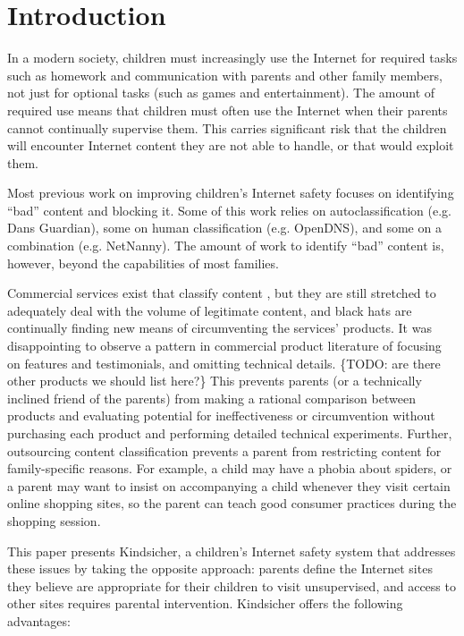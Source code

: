 

\vspace{20mm} 

\section{Introduction}
\nopagebreak
In a modern society, children must increasingly use the Internet for required
tasks such as homework and communication with parents and other family
members, not just for optional tasks (such as games and entertainment). 
%
The amount of required use means that children must often use the Internet
when their parents cannot continually supervise them. 
%
This carries significant risk that the children will encounter Internet
content they are not able to handle, or that would exploit them. 

Most previous work on improving children's Internet safety focuses on
identifying ``bad'' content and blocking it. Some of this work relies
on autoclassification (e.g. Dans Guardian\cite{dansguardian}), some on
human classification (e.g. OpenDNS\cite{opendns}), and some on a
combination (e.g. NetNanny\cite{netnanny}).
%
The amount of work to identify ``bad'' content is, however, beyond the
capabilities of most families.

Commercial services exist that classify content \cite{opendns}\cite{netnanny},
but they are still stretched to adequately deal with the volume of legitimate
content, and black hats are continually finding new means of circumventing the
services' products.
%
It was disappointing to observe a pattern in commercial product literature of
focusing on features and testimonials, and omitting technical
details.\cite{opendns} \{TODO: are there other products we should list here?\}
%
This prevents parents (or a technically inclined friend of the parents) from
making a rational comparison between products and evaluating potential for
ineffectiveness or circumvention without purchasing each product and
performing detailed technical experiments.
%
Further, outsourcing content classification prevents a parent from restricting
content for family-specific reasons. 
%
For example, a child may have a phobia about spiders, or a parent may want to
insist on accompanying a child whenever they visit certain online shopping
sites, so the parent can teach good consumer practices during the shopping
session. 

This paper presents Kindsicher, a children's Internet safety system
that addresses these issues by taking the opposite approach: parents
define the Internet sites they believe are appropriate for their
children to visit unsupervised, and access to other sites requires
parental intervention.
%
Kindsicher offers the following advantages:


